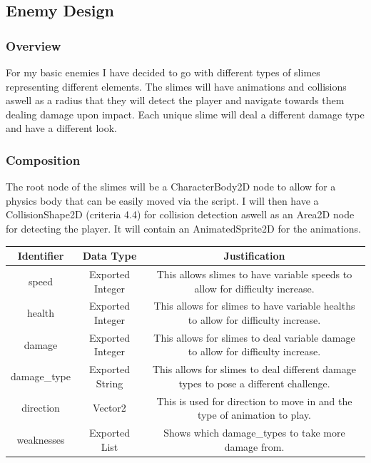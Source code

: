 \documentclass{article}
\begin{document}
        \subsection{Enemy Design}
        \subsubsection{Overview}
        For my basic enemies I have decided to go with different types of slimes representing different elements. The slimes will have animations and collisions aswell as a radius that they will detect the player and navigate towards them dealing damage upon impact. Each unique slime will deal a different damage type and have a different look.\\
        \subsubsection{Composition}
        The root node of the slimes will be a CharacterBody2D node to allow for a physics body that can be easily moved via the script. I will then have a CollisionShape2D (criteria 4.4) for collision detection aswell as an Area2D node for detecting the player. It will contain an AnimatedSprite2D for the animations.\\
        \begin{tabular}{|c|c|c|}
                \hline
                Identifier&Data Type&Justification\\
                \hline
                speed&Exported Integer&This allows slimes to have variable speeds to allow for difficulty increase.\\
                \hline
                health&Exported Integer&This allows for slimes to have variable healths to allow for difficulty increase.\\
                \hline
                damage&Exported Integer&This allows for slimes to deal variable damage to allow for difficulty increase.\\
                \hline
                damage\_type&Exported String&This allows for slimes to deal different damage types to pose a different challenge.\\
                \hline
                direction&Vector2&This is used for direction to move in and the type of animation to play.\\
                \hline
                weaknesses&Exported List&Shows which damage\_types to take more damage from.\\
                \hline
        \end{tabular}
\end{document}
